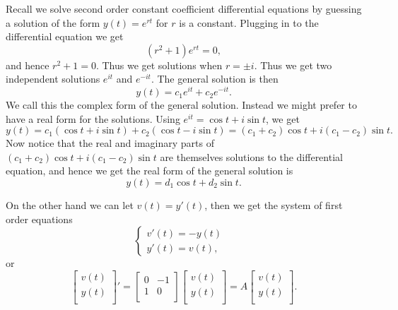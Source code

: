 \documentclass[12pt,letterpaper]{article}
\begin{document}
\begin{enumerate}
\Answer Recall we solve second order constant coefficient differential equations by guessing a solution of the form $y(t)=e^{rt}$ for $r$ is a constant. Plugging in to the differential equation we get $$(r^2+1)e^{rt}=0,$$ and hence $r^2+1=0$. Thus we get solutions when $r=\pm i$. Thus we get two independent solutions $e^{it}$ and $e^{-it}$. The general solution is then $$y(t)= c_1 e^{it}+c_2 e^{-it}.$$ We call this the complex form of the general solution. Instead we might prefer to have a real form for the solutions. Using $e^{it}=\cos{t}+i\sin{t}$, we get $$y(t)=c_1(\cos{t}+i\sin{t}) +c_2 (\cos{t}-i \sin{t})= (c_1+c_2)\cos{t}+i(c_1-c_2)\sin{t}.$$ Now notice that the real and imaginary parts of $(c_1+c_2)\cos{t}+i(c_1-c_2)\sin{t}$ are themselves solutions to the differential equation, and hence we get the real form of the general solution is $$y(t)= d_1 \cos{t} +d_2 \sin{t}.$$

On the other hand we can let $v(t)=y'(t)$, then we get the system of first order equations $$\begin{cases} v'(t) = -y(t)& \\ y'(t)=v(t),&\end{cases} $$ or $$\begin{bmatrix} v(t)\\ y(t)\\ \end{bmatrix}' = \begin{bmatrix} 0 & -1 \\ 1 & 0 \\ \end{bmatrix}\begin{bmatrix} v(t)\\ y(t)\\ \end{bmatrix}=A\begin{bmatrix} v(t)\\ y(t)\\ \end{bmatrix}.$$


\end{enumerate}
\end{document}
